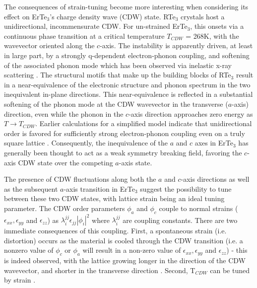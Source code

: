 \documentclass[%
 reprint, %
amsmath,amssymb,
aps,
]{revtex4-2}
\begin{document}
The consequences of strain-tuning become more interesting when considering its effect on ErTe$_3$'s charge density wave (CDW) state. RTe$_3$ crystals host a unidirectional, incommensurate CDW. For un-strained ErTe$_3$, this onsets via a continuous phase transition at a critical temperature $T_{CDW}$ = 268K, with the wavevector oriented along the $c$-axis.\cite{Ru2006}\cite{Ru_th} The instability is apparently driven, at least in large part, by a strongly q-dependent electron-phonon coupling, and softening of the associated phonon mode which has been observed via inelastic x-ray scattering \cite{Maschek2015} \cite{Maschek2018}. The structural motifs that make up the building blocks of RTe$_3$ result in a near-equivalence of the electronic structure and phonon spectrum in the two inequivalent in-plane directions. This near-equivalence is reflected in a substantial softening of the phonon mode at the CDW wavevector in the transverse ($a$-axis) direction, even while the phonon in the $c$-axis direction approaches zero energy as $T \to T_{CDW}$.  Earlier calculations for a simplified model indicate that unidirectional order is favored for sufficiently strong electron-phonon coupling even on a truly square lattice \cite{Yao2006}. Consequently, the inequivalence of the $a$ and $c$ axes in ErTe$_3$ has generally been thought to act as a weak symmetry breaking field, favoring the $c$-axis CDW state over the competing $a$-axis state. %

The presence of CDW fluctuations along both the $a$ and $c$-axis directions \cite{Maschek2015} as well as the subsequent $a$-axis transition in ErTe$_3$ \cite{Ru2008} suggest the possibility to tune between these two CDW states, with lattice strain being an ideal tuning parameter. The CDW order parameters $\phi_a$ and $\phi_c$ couple to normal strains ($\epsilon_{xx},\epsilon_{yy}$ and $\epsilon_{zz}$) as $\lambda^{jj}_i \epsilon_{jj}|\phi_i|^2$ where $\lambda_i^{jj}$ are coupling constants. There are two immediate consequences of this coupling. First, a spontaneous strain (i.e. distortion) occurs as the material is cooled through the CDW transition (i.e. a nonzero value of $\phi_c$ or $\phi_a$ will result in a non-zero value of $\epsilon_{xx},\epsilon_{yy}$ and $\epsilon_{zz}$) - this is indeed observed, with the lattice growing longer in the direction of the CDW wavevector, and shorter in the transverse direction \cite{Ru2008}. Second, T$_{CDW}$ can be tuned by strain \cite{Straquadine2020}.
\end{document}
